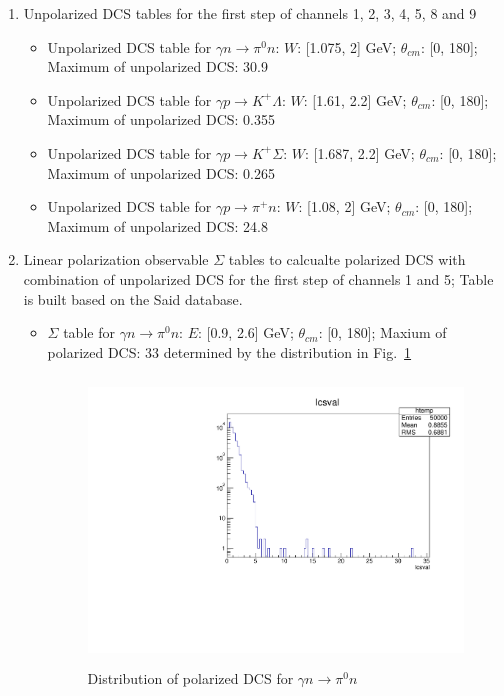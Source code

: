 \documentclass[a4paper]{article}
\begin{document}
\begin{enumerate}
\item Unpolarized DCS tables for the first step of channels 1, 2, 3, 4, 5, 8 and 9
 \begin{itemize}
  \item Unpolarized DCS table for $\gamma n\rightarrow\pi^0 n$: $W$: [1.075, 2] GeV; $\theta_{cm}$: [0, 180]; Maximum of unpolarized DCS: 30.9
  \item Unpolarized DCS table for $\gamma p\rightarrow K^+\Lambda$: $W$: [1.61, 2.2] GeV; $\theta_{cm}$: [0, 180]; Maximum of unpolarized DCS: 0.355
  \item Unpolarized DCS table for $\gamma p\rightarrow K^+\Sigma$: $W$: [1.687, 2.2] GeV; $\theta_{cm}$: [0, 180]; Maximum of unpolarized DCS: 0.265
  \item Unpolarized DCS table for $\gamma p\rightarrow\pi^+ n$: $W$: [1.08, 2] GeV; $\theta_{cm}$: [0, 180]; Maximum of unpolarized DCS: 24.8
  \end{itemize}

\item Linear polarization observable $\Sigma$ tables to calcualte polarized DCS with combination of unpolarized DCS for the first step of channels 1 and 5; Table is built based on the Said database.
 \begin{itemize}
  \item $\Sigma$ table for $\gamma n\rightarrow\pi^0 n$: $E$: [0.9, 2.6] GeV; $\theta_{cm}$: [0, 180]; Maxium of polarized DCS: 33 determined by the distribution in Fig.~\ref{pdcs-value-pi0}

\begin{figure}[H]
   \begin{center}
   \includegraphics[width=6in,height=3in]{pdcs-value-pi0.pdf} 
   \caption[]{Distribution of polarized DCS for $\gamma n\rightarrow\pi^0 n$}      \label{pdcs-value-pi0}
   \end{center}
\end{figure}


\end{itemize}
\end{enumerate}
\end{document}
